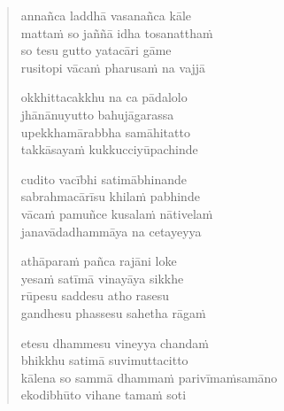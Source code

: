\clearpage
\begin{verse}

annañca laddhā vasanañca kāle\\
mattaṁ so jaññā idha tosanatthaṁ\\
so tesu gutto yatacāri gāme\\
rusitopi vācaṁ pharusaṁ na vajjā

okkhittacakkhu na ca pādalolo\\
jhānānuyutto bahujāgarassa\\
upekkhamārabbha samāhitatto\\
takkāsayaṁ kukkucciyūpachinde

cudito vacībhi satimābhinande\\
sabrahmacārīsu khilaṁ pabhinde\\
vācaṁ pamuñce kusalaṁ nātivelaṁ\\
janavādadhammāya na cetayeyya

athāparaṁ pañca rajāni loke\\
yesaṁ satīmā vinayāya sikkhe\\
rūpesu saddesu atho rasesu\\
gandhesu phassesu sahetha rāgaṁ

etesu dhammesu vineyya chandaṁ\\
bhikkhu satimā suvimuttacitto\\
kālena so sammā dhammaṁ parivīmaṁsamāno\\
ekodibhūto vihane tamaṁ soti

\end{verse}


